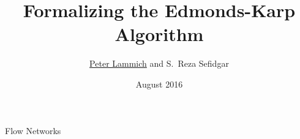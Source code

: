 \documentclass[fleqn]{beamer}
\title{Formalizing the Edmonds-Karp Algorithm}
\author[Peter Lammich]{\underline{Peter Lammich} and S.~Reza Sefidgar}
\institute[TUM] %
{ TU M\"unchen %
}
\date {August 2016}
\begin{document}
% 

\begin{frame}
  \titlepage
\end{frame}

{

  \def\basicnet{
    \tikzstyle{nd}=[shape=circle,draw, minimum size = 5mm]
    \node[nd] (s) {s};
    \node[nd] (a) [above right of = s] {a};
    \node[nd] (b) [below right of = s] {b};
    \node[nd] (c) [right of = a] {c};
    \node[nd] (d) [right of = b] {d};
    \node[nd] (t) [below right of = c] {t};
  }
  \def\capedges{
    \tikzstyle{lab}=[text=capacity]
    \draw[->] (s) to node[lab] {3} (a);
    \draw[->] (s) to node[lab] {5} (b);
    \draw[->] (a) to node[lab] {6} (c);
    \draw[->] (b) to node[lab] {3} (d);
    \draw[->] (c) to node[lab] {4} (t);
    \draw[->] (d) to node[lab] {4} (t);

    \draw[->] (a) to node[lab] {3} (d);
  }
  \def\flowa{
    \draw[dflow,line width = 3pt] (s) to node[flow] {3} (a);
    \draw[dflow,line width = 3pt] (a) to node[flow] {3} (d);
    \draw[dflow,line width = 3pt] (d) to node[flow] {3} (t);
  }
  \def\augpatha{
    \draw[aug] (s) to (b);
    \draw[aug] (b) to (d);
    \draw[aug] (d) to (t);
  }
  \def\flowb{
    \draw[dflow,line width = 3pt] (s) to node[flow] {3} (a);
    \draw[dflow,line width = 3pt] (a) to node[flow] {3} (d);
    \draw[dflow,line width = 4pt] (d) to node[flow] {4} (t);
    \draw[dflow,line width = 1pt] (s) to node[flow] {1} (b);
    \draw[dflow,line width = 1pt] (b) to node[flow] {1} (d);
  }
  \def\augpathb{
    \draw[aug] (s) to (b);
    \draw[aug] (b) to (d);
    \draw[aug] (d) to (a);
    \draw[aug] (a) to (c);
    \draw[aug] (c) to (t);
  }
  \def\flowc{
    \draw[dflow,line width = 3pt] (s) to node[flow] {3} (a);
    \draw[dflow,line width = 1pt] (a) to node[flow] {1} (d);
    \draw[dflow,line width = 4pt] (d) to node[flow] {4} (t);
    \draw[dflow,line width = 3pt] (s) to node[flow] {3} (b);
    \draw[dflow,line width = 3pt] (b) to node[flow] {3} (d);

    \draw[dflow,line width = 2pt] (a) to node[flow] {2} (c);
    \draw[dflow,line width = 2pt] (c) to node[flow] {2} (t);
  }


\begin{frame}{Flow Networks}
  \begin{minipage}{.49\textwidth}
\end{minipage}
\end{frame}}
\end{document}
